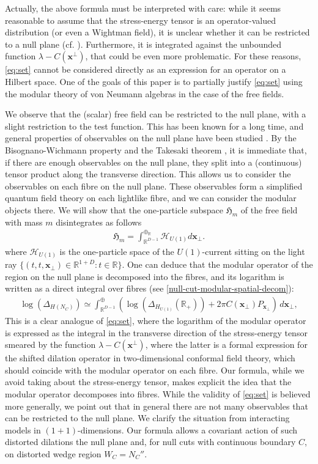 \documentclass[12pt]{article}
\def\RR{{\mathbb R}}
\def\H{{\mathcal H}}
\def\l{\lambda}
\def\hm{\mathfrak{H}_m}
\def\tx{\pmb{x}}
\theoremstyle{remark}
\begin{document}
Actually, the above formula must be interpreted with care:
while it seems reasonable to assume that the stress-energy tensor is an operator-valued distribution
(or even a Wightman field), it is unclear whether it can be restricted to a null plane (cf.\! \cite{Verch00, FR03}).
Furthermore, it is integrated against the unbounded function $\l - C(\pmb{x}^\perp)$,
that could be even more problematic.
For these reasons, \eqref{eq:set} cannot be considered directly as an expression for an operator on
a Hilbert space. One of the goals of this paper is to partially justify \eqref{eq:set}
using the modular theory of von Neumann algebras in the case of the free fields.

We observe that the (scalar) free field can be restricted to the null plane, with a slight
restriction to the test function. This has been known for a long time, and general properties of
observables on the null plane have been studied \cite{SS72, Driessler76-1, Driessler76-2, GLRV01, Ullrich04}.
By the Bisognano-Wichmann property \cite{BW76} and the Takesaki theorem \cite[Theorem IX.4.2]{TakesakiIII},
it is immediate that, if there are enough observables on the null plane, they split
into a (continuous) tensor product along the transverse direction.
This allows us to consider the observables on each fibre on the null plane.
These observables form a simplified quantum field theory on each lightlike fibre, and we can consider
the modular objects there.
We will show that the one-particle subspace $\hm$ of the free field with mass $m$
disintegrates as follows
\begin{align}\label{eq:ddd}
  \hm=\int_{\RR^{D-1}}^{\oplus_\RR} \H_{U(1)}d\tx_\perp.
\end{align}
where $\H_{U(1)}$ is the one-particle space of the $U(1)$-current sitting on the light ray $\{(t,t,\tx_\perp)\in\RR^{1+D}:t\in\RR\}$.
One can deduce that the modular operator of the region on the null plane is decomposed into the fibres, and its logarithm is written as a direct integral over fibres
(see \eqref{null-cut-modular-spatial-decom}):
\begin{align*}
  \log(\Delta_{H(N_C)})\simeq \int^\oplus_{\RR^{D-1}}\left( \log(\Delta_{H_{U(1)}}(\RR_+))+ 2\pi C(\pmb{x}_\perp) P_{\pmb{x}_\perp}\right)\,d\pmb{x}_\perp,
\end{align*}
This is a clear analogue of \eqref{eq:set}, where the logarithm of the modular operator is expressed as the integral
in the transverse direction of the stress-energy tensor smeared by the function $\l - C(\pmb{x}^\perp)$,
where the latter is a formal expression for the shifted dilation operator in two-dimensional conformal field theory,
which should coincide with the modular operator on each fibre.
Our formula, while we avoid taking about the stress-energy tensor, makes explicit the idea that
the modular operator decomposes into fibres. While the validity of \eqref{eq:set} is believed more generally, we point out that in general
there are not many observables that can be restricted to the null plane.
We clarify the situation from interacting models in $(1+1)$-dimensions.
Our formula allows a covariant action of such distorted dilations the null plane and, for null cuts with continuous boundary $C$, on distorted wedge region $W_C=N_C''$.
\end{document}
